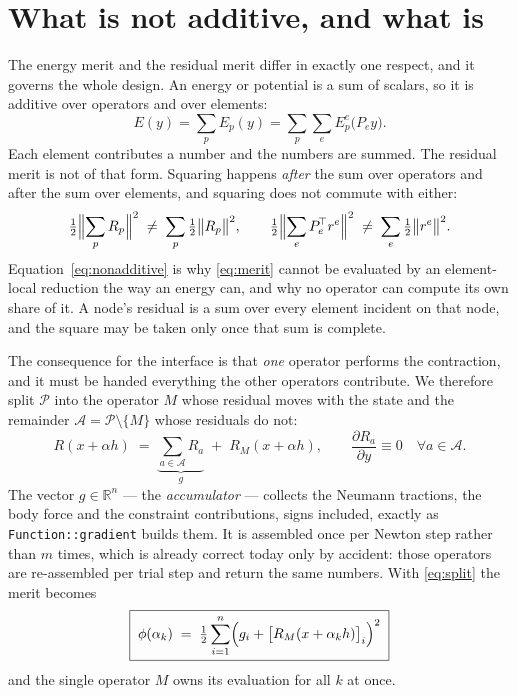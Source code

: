 \documentclass[11pt]{article}
\newcommand{\R}{\mathbb{R}}
\begin{document}
\section{What is not additive, and what is}

The energy merit and the residual merit differ in exactly one respect, and it
governs the whole design.  An energy or potential is a sum of scalars, so it is
additive over operators and over elements:
\begin{equation}
  E(y) = \sum_{p} E_p(y) = \sum_{p}\sum_{e} E_p^e\bigl(P_e y\bigr).
\end{equation}
Each element contributes a number and the numbers are summed.  The residual merit
is not of that form.  Squaring happens \emph{after} the sum over operators and
after the sum over elements, and squaring does not commute with either:
\begin{equation}
  \tfrac12\Bigl\|\sum_{p} R_p\Bigr\|^2 \;\neq\; \sum_{p}\tfrac12\bigl\|R_p\bigr\|^2,
  \qquad
  \tfrac12\Bigl\|\sum_{e} P_e^{\!\top} r^e\Bigr\|^2 \;\neq\; \sum_{e}\tfrac12\bigl\|r^e\bigr\|^2 .
  \label{eq:nonadditive}
\end{equation}
Equation~\eqref{eq:nonadditive} is why \eqref{eq:merit} cannot be evaluated by an
element-local reduction the way an energy can, and why no operator can compute its
own share of it.  A node's residual is a sum over every element incident on that
node, and the square may be taken only once that sum is complete.

The consequence for the interface is that \emph{one} operator performs the
contraction, and it must be handed everything the other operators contribute.
We therefore split $\mathcal{P}$ into the operator $M$ whose residual moves with
the state and the remainder $\mathcal{A}=\mathcal{P}\setminus\{M\}$ whose residuals
do not:
\begin{equation}
  R(x+\alpha h) \;=\; \underbrace{\sum_{a\in\mathcal{A}} R_a}_{\textstyle g}
  \;+\; R_M(x+\alpha h),
  \qquad
  \frac{\partial R_a}{\partial y} \equiv 0 \quad\forall a\in\mathcal{A}.
  \label{eq:split}
\end{equation}
The vector $g\in\R^n$ --- the \emph{accumulator} --- collects the Neumann
tractions, the body force and the constraint contributions, signs included,
exactly as \texttt{Function::gradient} builds them.  It is assembled once per
Newton step rather than $m$ times, which is already correct today only by
accident: those operators are re-assembled per trial step and return the same
numbers.  With \eqref{eq:split} the merit becomes
\begin{equation}
  \boxed{\;
  \phi(\alpha_k) \;=\; \tfrac12 \sum_{i=1}^{n}
  \Bigl( g_i + \bigl[R_M(x+\alpha_k h)\bigr]_i \Bigr)^{2}
  \;}
  \label{eq:contract}
\end{equation}
and the single operator $M$ owns its evaluation for all $k$ at once.
\end{document}
